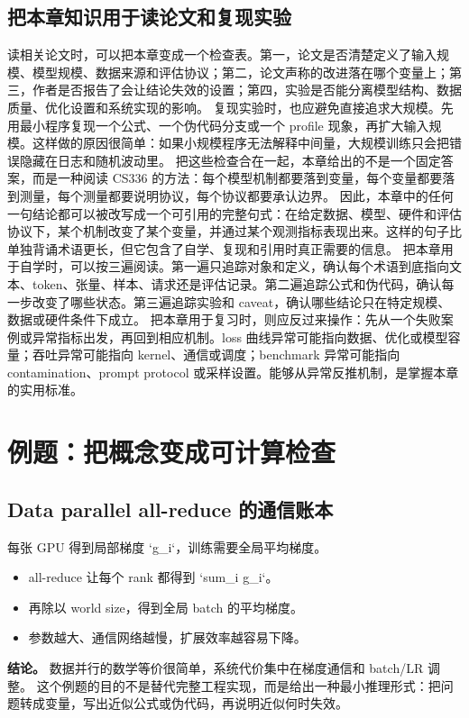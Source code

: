 \documentclass[a4paper]{article}
\begin{document}
\subsection{把本章知识用于读论文和复现实验}
读相关论文时，可以把本章变成一个检查表。第一，论文是否清楚定义了输入规模、模型规模、数据来源和评估协议；第二，论文声称的改进落在哪个变量上；第三，作者是否报告了会让结论失效的设置；第四，实验是否能分离模型结构、数据质量、优化设置和系统实现的影响。
复现实验时，也应避免直接追求大规模。先用最小程序复现一个公式、一个伪代码分支或一个 profile 现象，再扩大输入规模。这样做的原因很简单：如果小规模程序无法解释中间量，大规模训练只会把错误隐藏在日志和随机波动里。
把这些检查合在一起，本章给出的不是一个固定答案，而是一种阅读 CS336 的方法：每个模型机制都要落到变量，每个变量都要落到测量，每个测量都要说明协议，每个协议都要承认边界。
因此，本章中的任何一句结论都可以被改写成一个可引用的完整句式：在给定数据、模型、硬件和评估协议下，某个机制改变了某个变量，并通过某个观测指标表现出来。这样的句子比单独背诵术语更长，但它包含了自学、复现和引用时真正需要的信息。
把本章用于自学时，可以按三遍阅读。第一遍只追踪对象和定义，确认每个术语到底指向文本、token、张量、样本、请求还是评估记录。第二遍追踪公式和伪代码，确认每一步改变了哪些状态。第三遍追踪实验和 caveat，确认哪些结论只在特定规模、数据或硬件条件下成立。
把本章用于复习时，则应反过来操作：先从一个失败案例或异常指标出发，再回到相应机制。loss 曲线异常可能指向数据、优化或模型容量；吞吐异常可能指向 kernel、通信或调度；benchmark 异常可能指向 contamination、prompt protocol 或采样设置。能够从异常反推机制，是掌握本章的实用标准。
\section{例题：把概念变成可计算检查}
\subsection{Data parallel all-reduce 的通信账本}
每张 GPU 得到局部梯度 `g\_i`，训练需要全局平均梯度。
\begin{itemize}
\item all-reduce 让每个 rank 都得到 `sum\_i g\_i`。
\item 再除以 world size，得到全局 batch 的平均梯度。
\item 参数越大、通信网络越慢，扩展效率越容易下降。
\end{itemize}
\textbf{结论。} 数据并行的数学等价很简单，系统代价集中在梯度通信和 batch/LR 调整。
这个例题的目的不是替代完整工程实现，而是给出一种最小推理形式：把问题转成变量，写出近似公式或伪代码，再说明近似何时失效。
\end{document}
